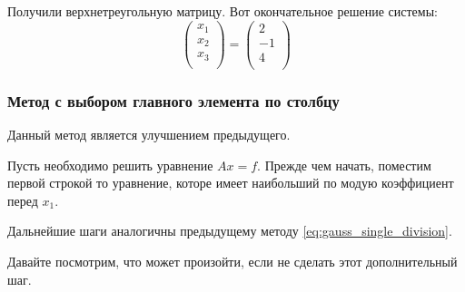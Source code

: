 \documentclass{article}
\begin{document}
\begin{example}
	Получили верхнетреугольную матрицу. Вот окончательное решение системы:
	\[
		\begin{pmatrix}
			x_1 \\
			x_2 \\
			x_3 \\
		\end{pmatrix}
		=
		\begin{pmatrix}
			2 \\
			-1 \\
			4 \\
		\end{pmatrix}
	\]
\end{example}

\subsubsection{Метод с выбором главного элемента по столбцу}
Данный метод является улучшением предыдущего.

\begin{algorithm}
	Пусть необходимо решить уравнение $Ax=f$. Прежде чем начать, поместим
	первой строкой то уравнение, которе имеет наибольший по модую
	коэффициент перед $x_1$.

	Дальнейшие шаги аналогичны предыдущему методу
	\eqref{eq:gauss_single_division}.
\end{algorithm}

Давайте посмотрим, что может произойти, если не сделать этот дополнительный шаг.
\end{document}
